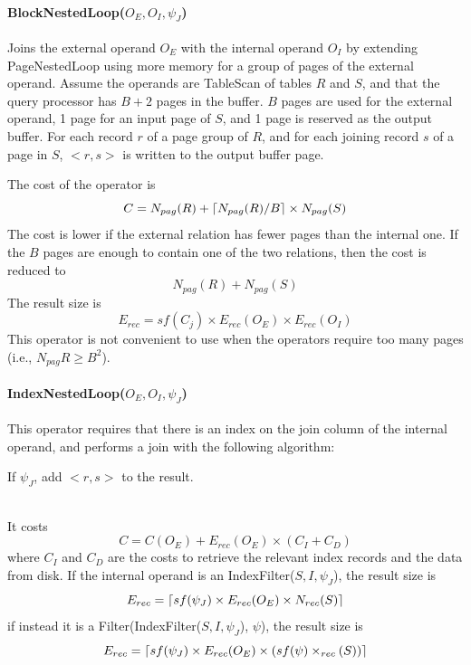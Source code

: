 \paragraph{BlockNestedLoop($O_E, O_I, \psi_J$)}
Joins the external operand $O_E$ with the internal operand $O_I$ by extending PageNestedLoop using more memory for a group of pages of the external operand. Assume the operands are TableScan of tables $R$ and $S$, and that the query processor has $B+2$ pages in the buffer. $B$ pages are used for the external operand, 1 page for an input page of $S$, and 1 page is reserved as the output buffer. For each record $r$ of a page group of $R$, and for each joining record $s$ of a page in $S$, $<r,s>$ is written to the output buffer page.

The cost of the operator is
\begin{equation*}
    C = N_{pag}(R) + \left\lceil N_{pag}(R)/B\right\rceil \times N_{pag}(S)
\end{equation*}
The cost is lower if the external relation has fewer pages than the internal one. If the $B$ pages are enough to contain one of the two relations, then the cost is reduced to
\begin{equation*}
    N_{pag}(R) + N_{pag}(S)
\end{equation*}
The result size is
\begin{equation*}
    E_{rec} = sf(C_j) \times E_{rec}(O_E) \times E_{rec}(O_I)
\end{equation*}
This operator is not convenient to use when the operators require too many pages (i.e., $N_{pag}R \geq B^2$).

\paragraph{IndexNestedLoop($O_E, O_I, \psi_J$)}
This operator requires that there is an index on the join column of the internal operand, and performs a join with the following algorithm:
\begin{algorithm}
\begin{algorithmic}
            \State If $\psi_J$, add $<r,s>$ to the result.
        \EndFor
    \EndFor
\end{algorithmic}
\end{algorithm} \\
It costs
\begin{equation*}
    C = C(O_E) + E_{rec}(O_E) \times (C_I + C_D)
\end{equation*}
where $C_I$ and $C_D$ are the costs to retrieve the relevant index records and the data from disk. If the internal operand is an IndexFilter($S,I,\psi_J$), the result size is
\begin{equation*}
    E_{rec} = \left\lceil sf(\psi_J) \times E_{rec}(O_E) \times N_{rec}(S)\right\rceil
\end{equation*}
if instead it is a Filter(IndexFilter($S, I, \psi_J$), $\psi$), the result size is
\begin{equation*}
    E_{rec} = \left\lceil sf(\psi_J) \times E_{rec}(O_E) \times (sf(\psi) \times_{rec}(S))\right\rceil
\end{equation*}

